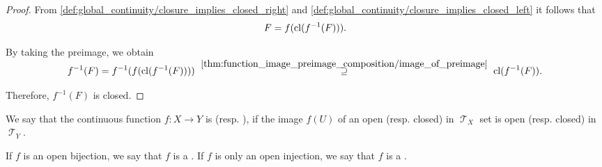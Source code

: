 \begin{proof}
  From \eqref{def:global_continuity/closure_implies_closed_right} and \eqref{def:global_continuity/closure_implies_closed_left} it follows that
  \begin{equation*}
    F = f(\operatorname{cl}(f^{-1}(F))).
  \end{equation*}

  By taking the preimage, we obtain
  \begin{equation*}
    f^{-1}(F)
    =
    f^{-1}(f(\cl(f^{-1}(F))))
    \reloset {\ref{thm:function_image_preimage_composition/image_of_preimage}} \supseteq
    \cl(f^{-1}(F)).
  \end{equation*}

  Therefore, \( f^{-1}(F) \) is closed.
\end{proof}

\begin{definition}\label{def:homeomorphism}
  We say that the continuous function \( f: X \to Y \) is  (resp. ), if the image \( f(U) \) of an open (resp. closed) in \( \mscrT_X \) set is open (resp. closed) in \( \mscrT_Y \).

  If \( f \) is an open bijection, we say that \( f \) is a . If \( f \) is only an open injection, we say that \( f \) is a .
\end{definition}

